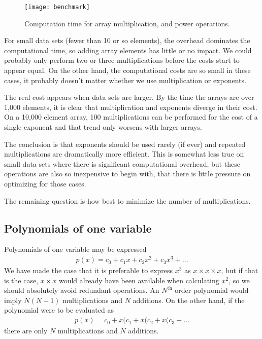 \documentclass[letterpaper,11pt]{article}
\begin{document}
\begin{figure}
\centering
\texttt{[image: benchmark]}
\caption{Computation time for array multiplication, and power operations.}\label{fig:benchmark}
\end{figure}

For small data sets (fewer than 10 or so elements), the overhead dominates the computational time, so adding array elements has little or no impact.  We could probably only perform two or three multiplications before the costs start to appear equal.  On the other hand, the computational costs are so small in these cases, it probably doesn't matter whether we use multiplication or exponents.

The real cost appears when data sets are larger.  By the time the arrays are over 1,000 elements, it is clear that multiplication and exponents diverge in their cost.  On a 10,000 element array, 100 multiplications can be performed for the cost of a single exponent and that trend only worsens with larger arrays.

The conclusion is that exponents should be used rarely (if ever) and repeated multiplications are dramatically more efficient.  This is somewhat less true on small data sets where there is significant computational overhead, but these operations are also so inexpensive to begin with, that there is little pressure on optimizing for those cases.

The remaining question is how best to minimize the number of multiplications.

\subsection{Polynomials of one variable}

Polynomials of one variable may be expressed
\begin{align}
p(x) = c_0 + c_1 x + c_2 x^2 + c_3 x^3 + \ldots
\end{align}
We have made the case that it is preferable to express $x^3$ as $x\times x\times x$, but if that is the case, $x \times x$ would already have been available when calculating $x^2$, so we should absolutely avoid redundant operations.  An $N^\mathrm{th}$ order polynomial would imply $N(N-1)$ multiplications and $N$ additions.  On the other hand, if the polynomial were to be evaluated as
\begin{align}
p(x) = c_0 + x(c_1 + x(c_2 + x(c_3 + \ldots
\end{align}
there are only $N$ multiplications and $N$ additions.
\end{document}
